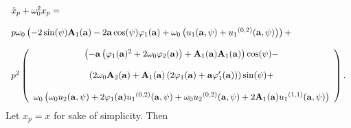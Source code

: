 \documentclass{ws-ijbc}
\begin{document}
\begin{equation}
\begin{tabular}{l}
$\ddot{x}_{p}+\omega _{0}^{2}x_{p}=$ \\ 
\\ 
$p\omega _{0}\left( -2\sin (\psi )\mathbf{A}_{1}(\mathbf{a})-2\mathbf{a}\cos
(\psi )\varphi _{1}(\mathbf{a})+\omega _{0}\left( u_{1}(\mathbf{a},\psi
)+u_{1}{}^{(0,2)}(\mathbf{a},\psi )\right) \right) +$ \\ 
\\ 
$p^{2}\left( 
\begin{array}{c}
\left( -\mathbf{a}\left( \varphi _{1}(\mathbf{a}){}^{2}+2\omega _{0}\varphi
_{2}(\mathbf{a})\right) +\mathbf{A}_{1}(\mathbf{a})\mathbf{A}_{1}(\mathbf{a}%
)\right) \cos (\psi )- \\ 
\\ 
\left( 2\omega _{0}\mathbf{A}_{2}(\mathbf{a})+\mathbf{A}_{1}(\mathbf{a}%
)\left( 2\varphi _{1}(\mathbf{a})+\mathbf{a}\varphi _{1}^{\prime }(\mathbf{a}%
)\right) \right) \sin (\psi )+ \\ 
\\ 
\omega _{0}\left( \omega _{0}u_{2}(\mathbf{a},\psi )+2\varphi _{1}(\mathbf{a}%
)u_{1}{}^{(0,2)}(\mathbf{a},\psi )+\omega _{0}u_{2}{}^{(0,2)}(\mathbf{a}%
,\psi )+2\mathbf{A}_{1}(\mathbf{a})u_{1}{}^{(1,1)}(\mathbf{a},\psi )\right)%
\end{array}%
\right) .$%
\end{tabular}
\label{16}
\end{equation}%
\[
\]%
Let $x_{p}=x$ for sake of simplicity. Then 
\end{document}
